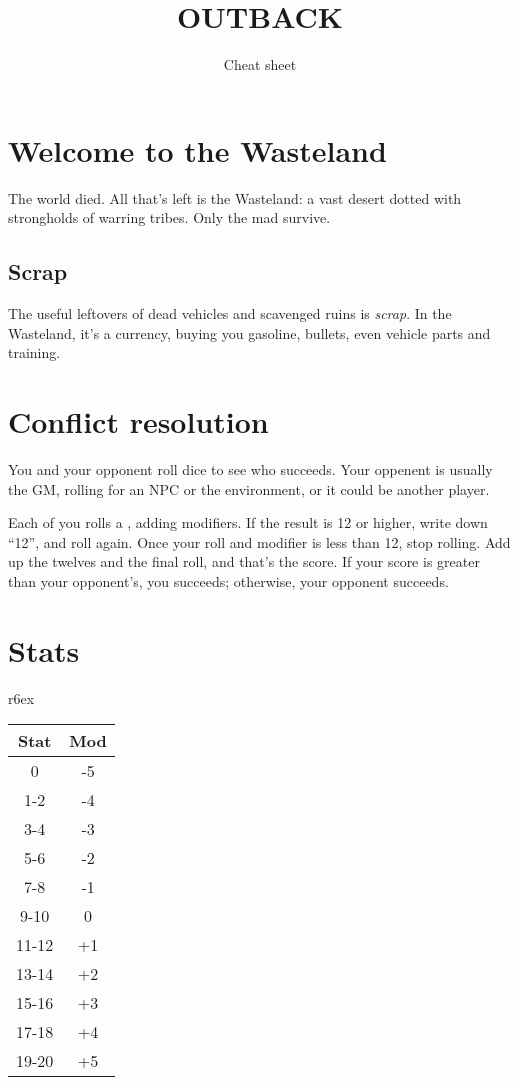 \documentclass[10pt, a4paper, twocolumn]{article}
\title{\uppercase{Outback}}
\subtitle{Cheat sheet}
\date{}
\begin{document}
\twocolumn[
  \begin{@twocolumnfalse}
    \maketitle
  \end{@twocolumnfalse}
]

\section{Welcome to the Wasteland}
The world died. All that's left is the Wasteland: a vast desert dotted with
strongholds of warring tribes. Only the mad survive.

\subsection{Scrap}
The useful leftovers of dead vehicles and scavenged ruins is \emph{scrap}. In
the Wasteland, it's a currency, buying you gasoline, bullets, even vehicle parts
and training.

\section{Conflict resolution}
You and your opponent roll dice to see who succeeds. Your oppenent is usually
the GM, rolling for an NPC or the environment, or it could be another player.

Each of you rolls a , adding modifiers. If the result is 12 or higher,
write down ``12'', and roll again. Once your roll and modifier is less than 12,
stop rolling. Add up the twelves and the final roll, and that's the score. If
your score is greater than your opponent's, you succeeds; otherwise, your
opponent succeeds.

\section{Stats}
\begin{wraptable}[9]{r}{6ex}
  \small
\vspace*{-3.5ex}
\hspace*{-4.5ex}
\begin{tabular}{cc}
  Stat  & Mod \\
  \hline 
  0     & -5       \\
  1-2   & -4       \\
  3-4   & -3       \\
  5-6   & -2       \\
  7-8   & -1       \\
  9-10  &  0       \\
  11-12 & +1       \\
  13-14 & +2       \\
  15-16 & +3       \\
  17-18 & +4       \\
  19-20 & +5
\end{tabular}
\end{wraptable}
\end{document}

